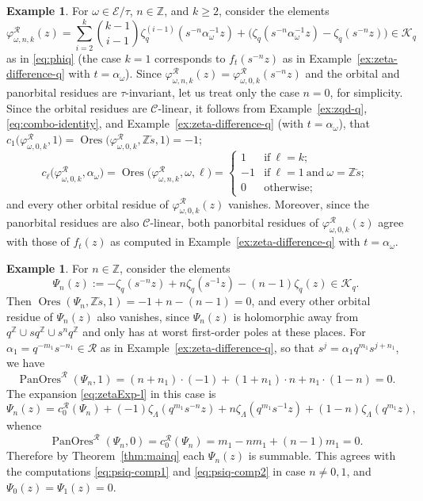 \documentclass[preprint,12pt]{elsarticle}
\numberwithin{equation}{section} %
\theoremstyle{theorem}
\theoremstyle{definition}
\newtheorem{example}[theorem]{Example}
\newcommand{\Cq}{\mathcal{C}} %
\newcommand{\Ca}{\mathcal{C}} %
\newcommand{\bk}{\mathcal{K}} %
\newcommand{\bkq}{\bk_{q}} %
\newcommand{\ec}{\mathcal{E}} %
\newcommand{\orbita}{{\ec/\tau}} %
\newcommand{\Z}{\mathbb{Z}} %
\newcommand{\zl}{\zeta_{\Lambda}}
\newcommand{\zq}{\zeta_{q}}
\newcommand{\zqd}[1]{\zq^{({#1})}} %
\DeclareMathOperator{\ores}{Ores}
\DeclareMathOperator{\pano}{PanOres}
\begin{document}
 \begin{example}\label{ex:phi-q}
    For $\omega\in\orbita$, $n\in\Z$, and $k\geq 2$, consider the elements \[\varphi^\mathcal{R}_{\omega,n,k}(z)=\sum_{i=2}^k\binom{k-1}{i-1}\zqd{i-1}(s^{-n}\alpha_\omega^{-1}z)+\bigl(\zq(s^{-n}\alpha_\omega^{-1}z)-\zq(s^{-n}z)\bigr)\in\bkq\] as in \eqref{eq:phiq} (the case $k=1$ corresponds to $f_t(s^{-n}z)$ as in Example~\ref{ex:zeta-difference-q} with $t=\alpha_\omega$). Since $\varphi^\mathcal{R}_{\omega,n,k}(z)=\varphi^\mathcal{R}_{\omega,0,k}(s^{-n}z)$ and the orbital and panorbital residues are $\tau$-invariant, let us treat only the case $n=0$, for simplicity. Since the orbital residues are $\Cq$-linear, it follows from Example~\ref{ex:zqd-q}, \eqref{eq:combo-identity}, and Example~\eqref{ex:zeta-difference-q} (with $t=\alpha_\omega$), that $c_1\bigl(\varphi^\mathcal{R}_{\omega,0,k},1\bigr)=\ores\bigl(\varphi^\mathcal{R}_{\omega,0,k},\Z\check{s},1\bigr)=-1$; \[c_\ell\bigl(\varphi^\mathcal{R}_{\omega,0,k},\alpha_\omega\bigr)=\ores\bigl(\varphi^\mathcal{R}_{\omega,n,k},\omega,\ell)=
    \begin{cases}
        1 & \text{if} \ \ell=k;\\
        -1 & \text{if} \ \ell=1 \ \text{and} \ \omega=\Z\check{s};\\
        0 & \text{otherwise};
    \end{cases}\] and every other orbital residue of $\varphi^\mathcal{R}_{\omega,0,k}(z)$ vanishes. Moreover, since the panorbital residues are also $\Ca$-linear, both panorbital residues of $\varphi^\mathcal{R}_{\omega,0,k}(z)$ agree with those of $f_t(z)$ as computed in Example~\ref{ex:zeta-difference-q} with $t=\alpha_\omega$. 
\end{example}

 \begin{example} \label{ex:psi-sum-q}For $n\in\Z$, consider the elements
    \[\Psi_n(z):=-\zq(s^{-n}z)+n\zq(s^{-1}z)-(n-1)\zq(z)\in\bkq.\] Then $\ores(\Psi_n,\Z\check{s},1)=-1+n-(n-1)=0$, and every other orbital residue of $\Psi_n(z)$ also vanishes, since $\Psi_n(z)$ is holomorphic away from $q^\Z\cup sq^\Z\cup s^nq^\Z$ and only has at worst first-order poles at these places. For $\alpha_1=q^{-m_1}s^{-n_1}\in\mathcal{R}$ as in Example~\ref{ex:zeta-difference-q}, so that $s^j=\alpha_1q^{m_1}s^{j+n_1}$, we have \[
    \pano^\mathcal{R}(\Psi_n,1)=(n+n_1)\cdot(-1)+(1+n_1)\cdot n+n_1\cdot(1-n)=0.\] The expansion \eqref{eq:zetaExp-l} in this case is \[\Psi_n(z)=c^\mathcal{R}_0(\Psi_n)+(-1)\zl(q^{m_1}s^{-n}z)+n\zl(q^{m_1}s^{-1}z)+(1-n)\zl(q^{m_1}z),\] whence \[\pano^\mathcal{R}(\Psi_n,0)=c_0^\mathcal{R}(\Psi_n)=m_1-nm_1+(n-1)m_1=0.\] Therefore by Theorem~\ref{thm:mainq} each $\Psi_n(z)$ is summable. This agrees with the computations \eqref{eq:psiq-comp1} and \eqref{eq:psiq-comp2} in case $n\neq0,1$, and $\Psi_0(z)=\Psi_1(z)=0$.
\end{example}
\end{document}
